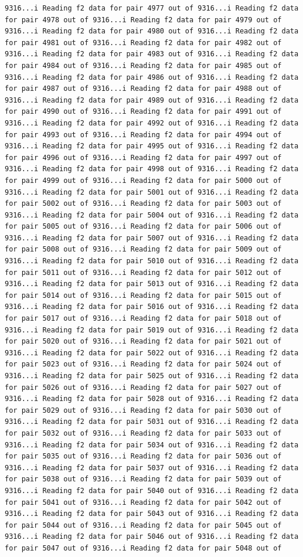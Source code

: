 \documentclass[
]{article}
\begin{document}
\begin{verbatim}
9316...i Reading f2 data for pair 4977 out of 9316...i Reading f2 data for pair 4978 out of 9316...i Reading f2 data for pair 4979 out of 9316...i Reading f2 data for pair 4980 out of 9316...i Reading f2 data for pair 4981 out of 9316...i Reading f2 data for pair 4982 out of 9316...i Reading f2 data for pair 4983 out of 9316...i Reading f2 data for pair 4984 out of 9316...i Reading f2 data for pair 4985 out of 9316...i Reading f2 data for pair 4986 out of 9316...i Reading f2 data for pair 4987 out of 9316...i Reading f2 data for pair 4988 out of 9316...i Reading f2 data for pair 4989 out of 9316...i Reading f2 data for pair 4990 out of 9316...i Reading f2 data for pair 4991 out of 9316...i Reading f2 data for pair 4992 out of 9316...i Reading f2 data for pair 4993 out of 9316...i Reading f2 data for pair 4994 out of 9316...i Reading f2 data for pair 4995 out of 9316...i Reading f2 data for pair 4996 out of 9316...i Reading f2 data for pair 4997 out of 9316...i Reading f2 data for pair 4998 out of 9316...i Reading f2 data for pair 4999 out of 9316...i Reading f2 data for pair 5000 out of 9316...i Reading f2 data for pair 5001 out of 9316...i Reading f2 data for pair 5002 out of 9316...i Reading f2 data for pair 5003 out of 9316...i Reading f2 data for pair 5004 out of 9316...i Reading f2 data for pair 5005 out of 9316...i Reading f2 data for pair 5006 out of 9316...i Reading f2 data for pair 5007 out of 9316...i Reading f2 data for pair 5008 out of 9316...i Reading f2 data for pair 5009 out of 9316...i Reading f2 data for pair 5010 out of 9316...i Reading f2 data for pair 5011 out of 9316...i Reading f2 data for pair 5012 out of 9316...i Reading f2 data for pair 5013 out of 9316...i Reading f2 data for pair 5014 out of 9316...i Reading f2 data for pair 5015 out of 9316...i Reading f2 data for pair 5016 out of 9316...i Reading f2 data for pair 5017 out of 9316...i Reading f2 data for pair 5018 out of 9316...i Reading f2 data for pair 5019 out of 9316...i Reading f2 data for pair 5020 out of 9316...i Reading f2 data for pair 5021 out of 9316...i Reading f2 data for pair 5022 out of 9316...i Reading f2 data for pair 5023 out of 9316...i Reading f2 data for pair 5024 out of 9316...i Reading f2 data for pair 5025 out of 9316...i Reading f2 data for pair 5026 out of 9316...i Reading f2 data for pair 5027 out of 9316...i Reading f2 data for pair 5028 out of 9316...i Reading f2 data for pair 5029 out of 9316...i Reading f2 data for pair 5030 out of 9316...i Reading f2 data for pair 5031 out of 9316...i Reading f2 data for pair 5032 out of 9316...i Reading f2 data for pair 5033 out of 9316...i Reading f2 data for pair 5034 out of 9316...i Reading f2 data for pair 5035 out of 9316...i Reading f2 data for pair 5036 out of 9316...i Reading f2 data for pair 5037 out of 9316...i Reading f2 data for pair 5038 out of 9316...i Reading f2 data for pair 5039 out of 9316...i Reading f2 data for pair 5040 out of 9316...i Reading f2 data for pair 5041 out of 9316...i Reading f2 data for pair 5042 out of 9316...i Reading f2 data for pair 5043 out of 9316...i Reading f2 data for pair 5044 out of 9316...i Reading f2 data for pair 5045 out of 9316...i Reading f2 data for pair 5046 out of 9316...i Reading f2 data for pair 5047 out of 9316...i Reading f2 data for pair 5048 out of 
\end{verbatim}
\end{document}
